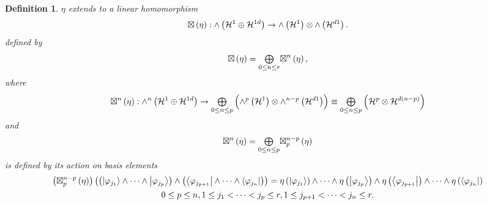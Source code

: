 \documentclass[aps,preprint]{revtex4}%
\newtheorem{definition}[theorem]{Definition}
\begin{document}
\begin{definition}
$\eta$ extends to a linear homomorphism
\begin{equation}
{\large \boxtimes}\left(  \eta\right)  :{\huge \wedge}\left(  \mathcal{H}%
^{1}\oplus\mathcal{H}^{1d}\right)  \rightarrow{\huge \wedge}\left(
\mathcal{H}^{1}\right)  \otimes{\huge \wedge}\left(  \mathcal{H}^{d1}\right)
.
\end{equation}
defined by
\begin{equation}
{\large \boxtimes}\left(  \eta\right)  =%
{\textstyle\bigoplus\limits_{0\leq n\leq r}}
{\large \boxtimes}^{n}\left(  \eta\right)  ,
\end{equation}
where
\begin{equation}
{\large \boxtimes}^{n}\left(  \eta\right)  :{\huge \wedge}^{n}\left(
\mathcal{H}^{1}\oplus\mathcal{H}^{1d}\right)  \rightarrow%
{\textstyle\bigoplus\limits_{0\leq n\leq p}}
\left(  \overset{}{{\huge \wedge}^{p}\left(  \mathcal{H}^{1}\right)
\otimes{\huge \wedge}^{n-p}\left(  \mathcal{H}^{d1}\right)  }\right)  \equiv%
{\textstyle\bigoplus\limits_{0\leq n\leq p}}
\left(  \overset{}{\mathcal{H}^{p}\otimes\mathcal{H}^{d\left(  n-p\right)  }%
}\right)
\end{equation}
and
\begin{equation}
{\large \boxtimes}^{n}\left(  \eta\right)  =%
{\textstyle\bigoplus\limits_{0\leq n\leq p}}
{\large \boxtimes}_{p}^{n-p}\left(  \eta\right)
\end{equation}
is defined by its action on basis elements%
\begin{gather}
\left(  {\large \boxtimes}_{p}^{n-p}\left(  \eta\right)  \right)  \left(
\left(  \left\vert \varphi_{j_{1}}\right\rangle \wedge\cdots\wedge\left\vert
\varphi_{j_{p}}\right\rangle \right)  \wedge\left(  \left\langle
\varphi_{j_{p+1}}\right\vert \wedge\cdots\wedge\left\langle \varphi_{j_{n}%
}\right\vert \right)  \right)  =\eta\left(  \left\vert \varphi_{j_{1}%
}\right\rangle \right)  \wedge\cdots\wedge\eta\left(  \left\vert
\varphi_{j_{p}}\right\rangle \right)  \wedge\eta\left(  \left\langle
\varphi_{j_{p+1}}\right\vert \right)  \wedge\cdots\wedge\eta\left(
\left\langle \varphi_{j_{n}}\right\vert \right) \\
0\leq p\leq n,1\leq j_{1}<\cdots<j_{p}\leq r,1\leq j_{p+1}<\cdots<j_{n}\leq r.
\end{gather}

\end{definition}
\end{document}
